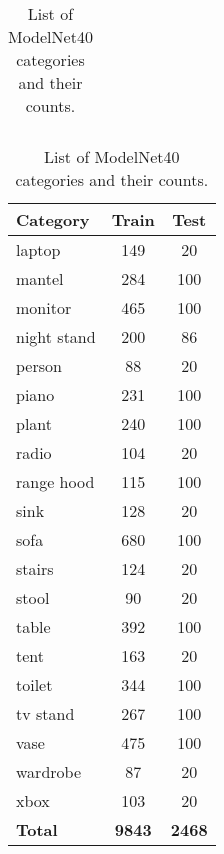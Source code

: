 \begin{table}[]
\begin{tabular}[t]{lcc}
	\end{tabular}
     \bigskip
	\begin{tabular}[t]{lcc}
		\hline
		\textbf{Category} & \textbf{Train} & \textbf{Test} \\ \hline
		laptop            & 149            & 20			   \\
		mantel            & 284            & 100           \\
		monitor           & 465            & 100           \\
		night stand       & 200            & 86            \\
		person            & 88             & 20            \\
		piano             & 231            & 100           \\
		plant             & 240            & 100           \\
		radio             & 104            & 20            \\
		range hood        & 115            & 100           \\
		sink              & 128            & 20            \\
		sofa              & 680            & 100           \\
		stairs            & 124            & 20            \\
		stool             & 90             & 20            \\
		table             & 392            & 100           \\
		tent              & 163            & 20            \\
		toilet            & 344            & 100           \\
		tv stand          & 267            & 100           \\
		vase              & 475            & 100           \\
		wardrobe          & 87             & 20            \\
		xbox              & 103            & 20            \\
		\textbf{Total}    & \textbf{9843 } & \textbf{2468} \\
		\hline
		
	\end{tabular}
	
	\caption{List of ModelNet40 categories and their counts.}
	\label{Table:modelnetcats}
\end{table}